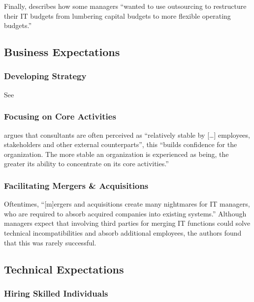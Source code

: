 \documentclass[12pt]{article}
\begin{document}
Finally, \citet{lacity1994} describes how some managers ``wanted to use
outsourcing to restructure their IT budgets from lumbering capital
budgets to more flexible operating budgets.''

\subsection{Business Expectations}\label{business-expectations}

\subsubsection{Developing Strategy}\label{developing-strategy}

See \citet{sturdy1998}

\subsubsection{Focusing on Core
Activities}\label{focusing-on-core-activities}

\citet[272-273]{furusten2009} argues that consultants are often
perceived as ``relatively stable by {[}\ldots{]} employees, stakeholders
and other external counterparts'', this ``builds confidence for the
organization. The more stable an organization is experienced as being,
the greater its ability to concentrate on its core activities.''

\subsubsection{Facilitating Mergers \&
Acquisitions}\label{facilitating-mergers-acquisitions}

Oftentimes, ``{[}m{]}ergers and acquisitions create many nightmares for
IT managers, who are required to absorb acquired companies into existing
systems.'' \citep[ 12]{lacity1994} Although managers expect that
involving third parties for merging IT functions could solve technical
incompatibilities and absorb additional employees, the authors found
that this was rarely successful.

\subsection{Technical Expectations}\label{technical-expectations}

\subsubsection{Hiring Skilled
Individuals}\label{hiring-skilled-individuals}
\end{document}
